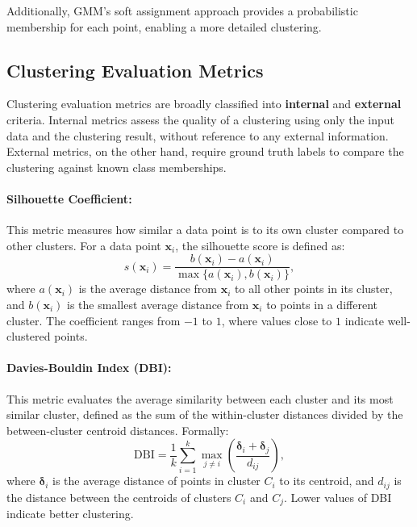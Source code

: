 Additionally, GMM's soft assignment approach provides a probabilistic
membership for each point, enabling a more detailed clustering.

\subsection{Clustering Evaluation Metrics}

Clustering evaluation metrics are broadly classified into \textbf{internal} and
\textbf{external} criteria. Internal metrics assess the quality of a clustering
using only the input data and the clustering result, without reference to any
external information. External metrics, on the other hand, require ground truth
labels to compare the clustering against known class memberships.

\paragraph{Silhouette Coefficient:} This metric measures how similar a data point is to its own cluster compared to
other clusters. For a data point $\mathbf{x}_i$, the silhouette score is
defined as:
\begin{equation}
    s(\mathbf{x}_i) = \frac{b(\mathbf{x}_i) - a(\mathbf{x}_i)}{\max\{a(\mathbf{x}_i), b(\mathbf{x}_i)\}},
\end{equation}
where $a(\mathbf{x}_i)$ is the average distance from $\mathbf{x}_i$ to all other points in its
cluster, and $b(\mathbf{x}_i)$ is the smallest average distance from $\mathbf{x}_i$ to points in a
different cluster. The coefficient ranges from $-1$ to $1$, where values close
to $1$ indicate well-clustered points.

\paragraph{Davies-Bouldin Index (DBI):} This metric evaluates the average similarity between each cluster and its most
similar cluster, defined as the sum of the within-cluster distances divided by
the between-cluster centroid distances. Formally:
\begin{equation}
    \text{DBI} = \frac{1}{k} \sum_{i=1}^{k} \max_{j \ne i} \left( \frac{\mathbf{\delta}_i + \mathbf{\delta}_j}{d_{ij}} \right),
\end{equation}
where $\mathbf{\delta}_i$ is the average distance of points in cluster $C_i$ to its
centroid, and $d_{ij}$ is the distance between the centroids of clusters $C_i$
and $C_j$. Lower values of DBI indicate better clustering.

